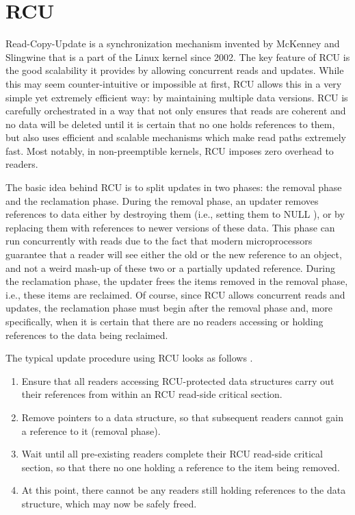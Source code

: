 \section{RCU}
Read-Copy-Update is a synchronization mechanism invented by
McKenney and Slingwine \cite{McKenney98} that is a part of the Linux kernel
since 2002. The key feature of RCU is the good scalability it provides
by allowing concurrent reads and updates. While this may seem
counter-intuitive or impossible at first, RCU allows this in a very
simple yet extremely efficient way: by maintaining multiple data
versions. RCU is carefully orchestrated in a way that not only
ensures that reads are coherent and no data will be deleted until
it is certain that no one holds references to them, but also uses
efficient and scalable mechanisms which make read paths extremely
fast. Most notably, in non-preemptible kernels, RCU imposes zero
overhead to readers.

The basic idea behind RCU is to split updates in two phases: the
removal phase and the reclamation phase. During the removal phase,
an updater removes references to data either by destroying them
(i.e., setting them to NULL ), or by replacing them with references to
newer versions of these data. This phase can run concurrently with
reads due to the fact that modern microprocessors guarantee that a
reader will see either the old or the new reference to an object, and
not a weird mash-up of these two or a partially updated reference.
During the reclamation phase, the updater frees the items removed
in the removal phase, i.e., these items are reclaimed. Of course, since
RCU allows concurrent reads and updates, the reclamation phase
must begin after the removal phase and, more specifically, when it
is certain that there are no readers accessing or holding references
to the data being reclaimed.

The typical update procedure using RCU looks as follows \cite{McKenney98}.

\begin{enumerate}
\item Ensure that all readers accessing RCU-protected data structures
carry out their references from within an RCU read-side critical
section.
\item Remove pointers to a data structure, so that subsequent readers
cannot gain a reference to it (removal phase).
\item Wait until all pre-existing readers complete their RCU read-side
critical section, so that there no one holding a reference to the
item being removed.
\item At this point, there cannot be any readers still holding references to the data structure, which may now be safely freed.
\end{enumerate}

